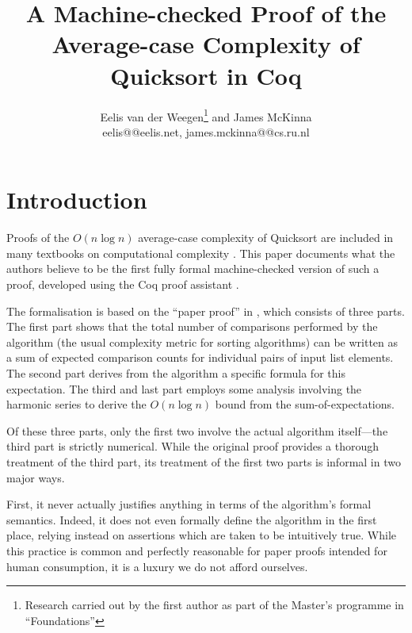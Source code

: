 \documentclass[runningheads]{llncs}
\newcommand{\eelis}{Eelis van der Weegen}
\newcommand{\james}{James McKinna}
\newcommand{\thetitle}{A Machine-checked Proof of the Average-case Complexity of Quicksort in Coq}
\begin{document}
\nocite{*}

\title{\thetitle}

\authorrunning{\em}
\titlerunning{\em}

\author{\eelis\thanks{Research carried out by the first author as part of the Master's programme in ``Foundations''} and \james \\
eelis@@eelis.net, james.mckinna@@cs.ru.nl}


\maketitle

\begin{abstract}
  
\end{abstract}

\section{Introduction}
\label{intro}

Proofs of the $O(n \log n)$ average-case complexity of Quicksort \cite{HoareQuick} are included in many textbooks on computational complexity \cite[for example]{introtoalgos}.
This paper documents what the authors believe to be the first fully formal machine-checked version of such a proof, developed using the Coq proof assistant \cite{coq}.

The formalisation is based on the ``paper proof'' in \cite{introtoalgos}, which consists of three parts. The first part shows that the total number of comparisons performed by the algorithm (the usual complexity metric for sorting algorithms) can be written as a sum of expected comparison counts for individual pairs of input list elements. The second part derives from the algorithm a specific formula for this expectation. The third and last part employs some analysis involving the harmonic series to derive the $O(n \log n)$ bound from the sum-of-expectations.

Of these three parts, only the first two involve the actual algorithm itself---the third part is strictly numerical. While the original proof provides a thorough treatment of the third part, its treatment of the first two parts is informal in two major ways.

First, it never actually justifies anything in terms of the algorithm's formal semantics. Indeed, it does not even formally define the algorithm in the first place, relying instead on assertions which are taken to be intuitively true. While this practice is common and perfectly reasonable for paper proofs intended for human consumption, it is a luxury we do not afford ourselves.
\end{document}
